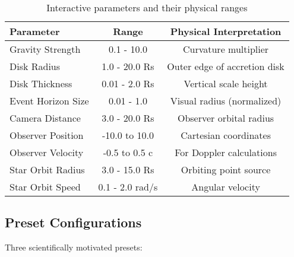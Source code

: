 \documentclass[12pt,a4paper]{article}
\theoremstyle{definition}
\theoremstyle{remark}
\begin{document}
\begin{table}[H]
\centering
\caption{Interactive parameters and their physical ranges}
\begin{tabular}{lcc}
\toprule
\textbf{Parameter} & \textbf{Range} & \textbf{Physical Interpretation} \\
\midrule
Gravity Strength & 0.1 - 10.0 & Curvature multiplier \\
Disk Radius & 1.0 - 20.0 Rs & Outer edge of accretion disk \\
Disk Thickness & 0.01 - 2.0 Rs & Vertical scale height \\
Event Horizon Size & 0.01 - 1.0 & Visual radius (normalized) \\
Camera Distance & 3.0 - 20.0 Rs & Observer orbital radius \\
Observer Position & -10.0 to 10.0 & Cartesian coordinates \\
Observer Velocity & -0.5 to 0.5 c & For Doppler calculations \\
Star Orbit Radius & 3.0 - 15.0 Rs & Orbiting point source \\
Star Orbit Speed & 0.1 - 2.0 rad/s & Angular velocity \\
\bottomrule
\end{tabular}
\label{tab:parameter_ranges}
\end{table}

\subsection{Preset Configurations}

Three scientifically motivated presets:
\end{document}
